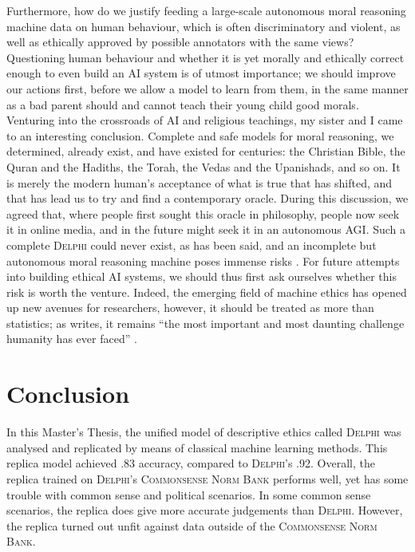 \documentclass[final]{clv3} %
\begin{document}
Furthermore, how do we justify feeding a large-scale autonomous moral reasoning machine data on human behaviour, which is often discriminatory and violent, as well as ethically approved by possible annotators with the same views? Questioning human behaviour and whether it is yet morally and ethically correct enough to even build an AI system is of utmost importance; we should improve our actions first, before we allow a model to learn from them, in the same manner as a bad parent should and cannot teach their young child good morals.\\

Venturing into the crossroads of AI and religious teachings, my sister and I came to an interesting conclusion. Complete and safe models for moral reasoning, we determined, already exist, and have existed for centuries: the Christian Bible, the Quran and the Hadiths, the Torah, the Vedas and the Upanishads, and so on. It is merely the modern human’s acceptance of what is true that has shifted, and that has lead us to try and find a contemporary oracle. During this discussion, we agreed that, where people first sought this oracle in philosophy, people now seek it in online media, and in the future might seek it in an autonomous AGI. Such a complete \textsc{Delphi} could never exist, as has been said, and an incomplete but autonomous moral reasoning machine poses immense risks \cite{tegmark}. For future attempts into building ethical AI systems, we should thus first ask ourselves whether this risk is worth the venture. Indeed, the emerging field of machine ethics has opened up new avenues for researchers, however,  it should be treated as more than statistics; as \citet{bostrom} writes, it remains “the most important and most daunting challenge humanity has ever faced” \cite[vii]{bostrom}.\\

\clearpage

\section{Conclusion}

In this Master’s Thesis, the unified model of descriptive ethics called \textsc{Delphi} was analysed and replicated by means of classical machine learning methods. This replica model achieved .83 accuracy, compared to \textsc{Delphi}’s .92. Overall, the replica trained on \textsc{Delphi}’s \textsc{Commonsense Norm Bank} performs well, yet has some trouble with common sense and political scenarios. In some common sense scenarios, the replica does give more accurate judgements than \textsc{Delphi}. However, the replica turned out unfit against data outside of the \textsc{Commonsense Norm Bank}.
\end{document}
